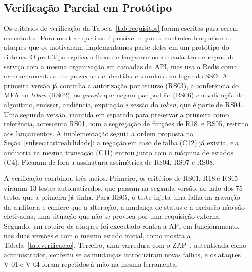 \documentclass[conference]{IEEEtran}
\begin{document}
\subsection{Verificação Parcial em Protótipo}
\label{subsec:verificacao}

Os critérios de verificação da Tabela~\ref{tab:requisitos} foram escritos para serem executados. Para mostrar que isso é possível e que os controles bloqueiam os ataques que os motivaram, implementamos parte deles em um protótipo do sistema. O protótipo replica o fluxo de lançamentos e o cadastro de regras de serviço com a mesma organização em camadas da API, mas usa o Redis como armazenamento e um provedor de identidade simulado no lugar do SSO. A primeira versão já continha a autorização por recurso (RS03), a conferência do MFA no \textit{token} (RS02), os \textit{guards} que negam por padrão (RS06) e a validação de algoritmo, emissor, audiência, expiração e sessão do \textit{token}, que é parte de RS04. Uma segunda versão, mantida em separado para preservar a primeira como referência, acrescenta RS01, com a segregação de funções de R18, e RS05, restrito aos lançamentos. A implementação seguiu a ordem proposta na Seção~\ref{subsec:rastreabilidade}: a negação em caso de falha (C12) já existia, e a auditoria na mesma transação (C11) entrou junto com a máquina de estados (C4). Ficaram de fora a assinatura assimétrica de RS04, RS07 e RS08.

A verificação combinou três meios. Primeiro, os critérios de RS01, R18 e RS05 viraram 13 testes automatizados, que passam na segunda versão, ao lado dos 75 testes que a primeira já tinha. Para RS05, o teste injeta uma falha na gravação da auditoria e confere que a alteração, a mudança de status e a exclusão não são efetivadas, uma situação que não se provoca por uma requisição externa. Segundo, um roteiro de ataques foi executado contra a API em funcionamento, nas duas versões e com o mesmo estado inicial, como mostra a Tabela~\ref{tab:verificacao}. Terceiro, uma varredura com o ZAP~\cite{zaproxy}, autenticada como administrador, conferiu se as mudanças introduziram novas falhas, e os ataques V-01 e V-04 foram repetidos à mão na mesma ferramenta.
\end{document}

